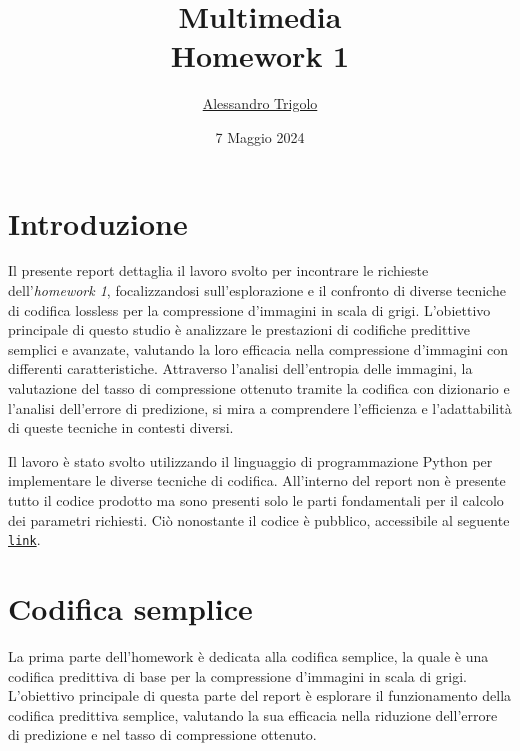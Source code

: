 \title{\vspace{160px} \textbf{\huge{Multimedia}} \\\vspace{17.5px} \LARGE{Homework 1}  \vspace{10px}}
\author{\href{https://github.com/imAlessas}{Alessandro Trigolo}}
\date{7 Maggio 2024}



\maketitle\newpage

\tableofcontents
\vspace{50px}
\listoffigures
\newpage


\section*{Introduzione}
Il presente report dettaglia il lavoro svolto per incontrare le richieste dell'\textsl{homework 1}, focalizzandosi sull'esplorazione e il confronto di diverse tecniche di codifica lossless per la compressione d'immagini in scala di grigi. L'obiettivo principale di questo studio è analizzare le prestazioni di codifiche predittive semplici e avanzate, valutando la loro efficacia nella compressione d'immagini con differenti caratteristiche. Attraverso l'analisi dell'entropia delle immagini, la valutazione del tasso di compressione ottenuto tramite la codifica con dizionario e l'analisi dell'errore di predizione, si mira a comprendere l'efficienza e l'adattabilità di queste tecniche in contesti diversi.

Il lavoro è stato svolto utilizzando il linguaggio di programmazione Python per implementare le diverse tecniche di codifica. All'interno del report non è presente tutto il codice prodotto ma sono presenti solo le parti fondamentali per il calcolo dei parametri richiesti. Ciò nonostante il codice è pubblico, accessibile al seguente \texttt{\href{https://github.com/imAlessas/computer-networks/tree/main/multimedia/hw-1/script}{link}}.




\newpage\section{Codifica semplice} 
La prima parte dell'homework è dedicata alla codifica semplice, la quale è una codifica predittiva di base per la compressione d'immagini in scala di grigi. L'obiettivo principale di questa parte del report è esplorare il funzionamento della codifica predittiva semplice, valutando la sua efficacia nella riduzione dell'errore di predizione e nel tasso di compressione ottenuto.


